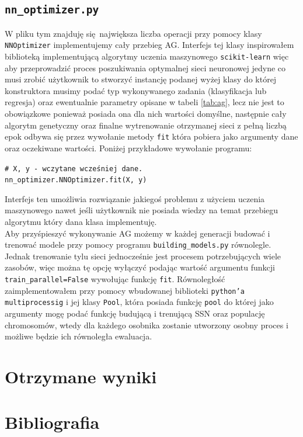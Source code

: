 \documentclass{article}
\begin{document}
\subsection{\texttt{nn\_optimizer.py}}
W pliku tym znajduję się największa liczba operacji przy pomocy klasy \texttt{NNOptimizer}
implementujemy cały przebieg AG. Interfejs tej klasy inspirowałem biblioteką implementującą
algorytmy uczenia maszynowego \texttt{scikit-learn} więc aby przeprowadzić proces poszukiwania
optymalnej sieci neuronowej jedyne co musi zrobić użytkownik to stworzyć instancję podanej
wyżej klasy do której konstruktora musimy podać typ wykonywanego zadania
(klasyfikacja lub regresja) oraz ewentualnie parametry opisane w tabeli 
\ref{tab:ag}, lecz nie jest to obowiązkowe ponieważ posiada ona dla nich wartości domyślne,
następnie cały algorytm genetyczny oraz finalne wytrenowanie otrzymanej sieci z pełną
liczbą epok odbywa się przez wywołanie metody \texttt{fit} która pobiera jako argumenty
dane oraz oczekiwane wartości. Poniżej przykładowe wywołanie programu:\\
\begin{center}
\texttt{\# X, y - wczytane wcześniej dane.\\nn\_optimizer.NNOptimizer.fit(X, y)\\}
\end{center}
Interfejs ten umożliwia rozwiązanie jakiegoś problemu z użyciem uczenia maszynowego
nawet jeśli użytkownik nie posiada wiedzy na temat przebiegu algorytmu który dana klasa 
implementuję.\\
\newline
Aby przyśpieszyć wykonywanie AG możemy w każdej generacji budować i trenować 
modele przy pomocy programu \texttt{building\_models.py} równolegle. Jednak trenowanie tylu
sieci jednocześnie jest procesem potrzebujących wiele zasobów, więc można tę opcję wyłączyć
podając wartość argumentu funkcji \texttt{train\_parallel=False} wywołując funkcję 
\texttt{fit}.
Równoległość zaimplementowałem przy pomocy wbudowanej biblioteki \texttt{python'a}
\texttt{multiprocessig} i jej klasy \texttt{Pool}, która posiada
funkcję \texttt{pool} do której jako argumenty mogę podać funkcję budującą i trenującą 
SSN oraz populację chromosomów, wtedy dla każdego osobnika zostanie utworzony osobny proces
i możliwe będzie ich równoległa ewaluacja.


\section{Otrzymane wyniki}

\section{Bibliografia}

\printbibliography
\end{document}
